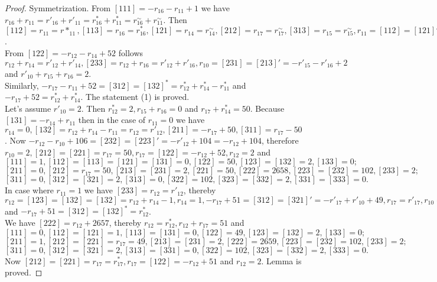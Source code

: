 \documentclass{article}
\theoremstyle{definition}
\theoremstyle{definition}
\theoremstyle{remark}
\begin{document}
\begin{proof} Symmetrization. From $[111] = -r_{16} - r_{11} + 1$ we have $r_{16} + r_{11} = r'_{16} + r'_{11} = r^*_{16} + r^*_{11} = r^\sim_{16} + r^\sim_{11}$. Then
 $[112] = r_{11} = r*_{11} , [113] = r_{16} = r^*_{16} , [121] = r_{14} = r^\sim_{14} , [212] = r_{17} = r^\sim_{17}, [313] = r_{15} = r^\sim_{15}, r_{11} = [112] = [121]' = r'_{14}, r'_{10} = [213] = r^*_{12}$. \\

From $[122] = -r_{12} - r_{14} + 52$ follows $r_{12} + r_{14} = r'_{12} + r'_{14}, [233] = r_{12} + r_{16} = r'_{12} + r'_{16}, r_{10} = [231] = [213]' = -r'_{15} - r'_{16} + 2$ and $r'_{10} + r_{15} + r_{16} = 2$. \\

Similarly, $-r_{17} - r_{11} + 52 = [312] = [132]^* = r^*_{12} + r^*_{14} - r^*_{11}$ and  $-r_{17} + 52 = r^*_{12} + r^*_{14}$. The statement (1) is proved.\\

Let's assume $ r'_{10} = 2$. Then $r^*_{12} = 2, r_{15} + r_{16} = 0$ and $r_{17} + r^*_{14} = 50$. Because $[131] = -r_{14} + r_{11}$ then in the case of $r_{11} = 0$ we have $r_{14} = 0, [132] = r_{12} + r_{14} - r_{11} = r_{12} = r'_{12}, [211] = -r_{17} + 50, [311] = r_{17} - 50$. Now $-r_{12} - r_{10} + 106 = [232] = [223]' = -r'_{12} + 104 = -r_{12} + 104$, therefore $r_{10} = 2, [212] = [221] = r_{17} = 50, r_{17} = [122] = -r_{12} + 52, r_{12} = 2$ and \\

$[111] = 1, [112] = [113] = [121] = [131] = 0, [122] = 50, [123] = [132] = 2, [133] = 0;$
$[211] = 0, [212] = r_{17} = 50, [213] = [231] = 2, [221] = 50, [222] = 2658, [223] = [232] = 102, [233] = 2;$
$[311] = 0, [312] = [321] = 2, [313] = 0, [322] = 102, [323] = [332] = 2, [331] = [333] = 0.$ \\

In case where $r_{11} = 1$ we have $[233] = r_{12} = r'_{12}$, thereby $r_{12} = [123] = [132] = [132] = r_{12} + r_{14} - 1, r_{14} = 1, -r_{17} + 51 = [312] = [321]' = -r'_{17} + r'_{10} + 49, r_{17} = r'_{17}, r_{10} = 2$ and $-r_{17} +51 = [312] = [132]^* = r^*_{12}$. \\

We have $[222] = r_{12} + 2657$, thereby $r_{12} = r^*_{12}, r_{12} + r_{17} = 51$ and \\
$[111] = 0, [112] = [121] = 1, [113] = [131] = 0, [122] = 49, [123] = [132] = 2, [133] = 0;$ \\
$[211] = 1, [212] = [221] = r_{17} = 49, [213] = [231] = 2, [222] = 2659, [223] = [232] = 102, [233] = 2;$ \\
$[311] = 0, [312] = [321] = 2, [313] = [331] = 0, [322] = 102, [323] = [332] = 2, [333] = 0.$ \\

Now $[212] = [221] = r_{17} = r^*_{17}, r_{17} = [122] = -r_{12} + 51$ and $r_{12} = 2$. Lemma is proved.
\end{proof}
\end{document}
